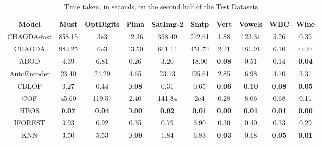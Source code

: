 \documentclass{article}
\begin{document}
\begin{table}[!t]
\renewcommand{\arraystretch}{1.15}
\caption{Time taken, in seconds, on the second half of the Test Datasets}
\label{supplement:table:results:test-time-2}
\vskip 0.15in
\begin{center}
\begin{small}
\begin{tabular}{|c|c|c|c|c|c|c|c|c|c|}
\hline
\textbf{Model} & \textbf{Must} & \textbf{OptDigits} & \textbf{Pima} & \textbf{SatImg-2} & \textbf{Smtp} & \textbf{Vert} & \textbf{Vowels} &  \textbf{WBC} & \textbf{Wine} \\
\hline
CHAODA-fast &        858.15 &            3e3 &         12.36 &              358.49 &        272.61 &               1.88 &          123.34 &          5.26 &          0.39 \\
\hline
CHAODA &        982.25 &            6e3 &         13.50 &              611.14 &        451.74 &               2.21 &          181.91 &          6.10 &          0.40 \\
\hline
ABOD &          4.39 &               6.81 &          0.26 &                3.20 &         18.00 &      \textbf{0.08} &            0.51 &          0.14 & \textbf{0.04} \\
\hline
AutoEncoder &         23.40 &              24.29 &          4.65 &               23.73 &        195.61 &               2.85 &            6.98 &          4.70 &          3.31 \\
\hline
CBLOF &          0.27 &               0.44 & \textbf{0.08} &                0.31 &          0.65 &      \textbf{0.06} &   \textbf{0.10} & \textbf{0.08} & \textbf{0.05} \\
\hline
COF &         45.60 &             119.57 &          2.40 &              141.84 &      2e4 &               0.28 &            8.06 &          0.68 &          0.11 \\
\hline
HBOS & \textbf{0.07} &      \textbf{0.04} & \textbf{0.00} &       \textbf{0.02} & \textbf{0.01} &      \textbf{0.00} &   \textbf{0.01} & \textbf{0.01} & \textbf{0.00} \\
\hline
IFOREST &          0.93 &               0.92 &          0.35 &                0.79 &          3.90 &               0.30 &            0.40 &          0.33 &          0.29 \\
\hline
KNN &          3.50 &               5.53 & \textbf{0.09} &                1.84 &          6.83 &      \textbf{0.03} &            0.18 & \textbf{0.05} & \textbf{0.01} \\

\end{tabular}
\end{small}
\end{center}
\end{table}
\end{document}
